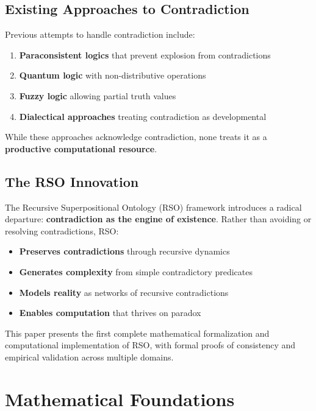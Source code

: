 \documentclass[11pt,a4paper]{article}
\begin{document}
\subsection{Existing Approaches to Contradiction}

Previous attempts to handle contradiction include:

\begin{enumerate}
    \item \textbf{Paraconsistent logics} \cite{dacosta1974} that prevent explosion from contradictions
    \item \textbf{Quantum logic} \cite{birkhoff1936} with non-distributive operations
    \item \textbf{Fuzzy logic} \cite{zadeh1965} allowing partial truth values
    \item \textbf{Dialectical approaches} \cite{hegel1807} treating contradiction as developmental
\end{enumerate}

While these approaches acknowledge contradiction, none treats it as a \textbf{productive computational resource}.

\subsection{The RSO Innovation}

The Recursive Superpositional Ontology (RSO) framework introduces a radical departure: \textbf{contradiction as the engine of existence}. Rather than avoiding or resolving contradictions, RSO:

\begin{itemize}
    \item \textbf{Preserves contradictions} through recursive dynamics
    \item \textbf{Generates complexity} from simple contradictory predicates
    \item \textbf{Models reality} as networks of recursive contradictions
    \item \textbf{Enables computation} that thrives on paradox
\end{itemize}

This paper presents the first complete mathematical formalization and computational implementation of RSO, with formal proofs of consistency and empirical validation across multiple domains.

\section{Mathematical Foundations}
\end{document}
